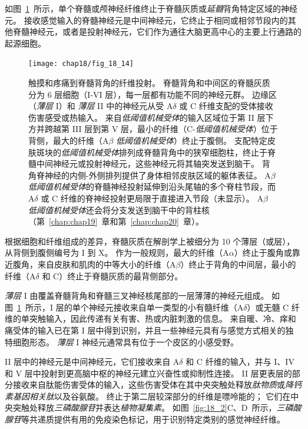 如图~\ref{fig:18_14}~所示，单个脊髓或颅神经纤维终止于脊髓灰质或\textit{延髓}背角特定区域的神经元。
接收感觉输入的脊髓神经元是中间神经元，它终止于相同或相邻节段内的其他脊髓神经元，或者是投射神经元，它们作为通往大脑更高中心的主要上行通路的起源细胞。


\begin{figure}[htbp]
	\centering
	\texttt{[image: chap18/fig\_18\_14]}
	\caption{触摸和疼痛到脊髓背角的纤维投射。
		脊髓背角和中间区的脊髓灰质分为 6 层细胞（I-VI 层），每一层都有功能不同的神经元群。
		边缘区（\textit{薄层} I）和 \textit{薄层} II 中的神经元从受 A$\delta$ 或 C 纤维支配的受体接收伤害感受或热输入。 
		来自\textit{低阈值机械受体}的输入区域位于第 II 层下方并跨越第 III 层到第 V 层，最小的纤维（C-\textit{低阈值机械受体}）位于背侧，最大的纤维（A$\beta$ \textit{低阈值机械受体}）终止于腹侧。
		支配特定皮肤斑块的\textit{低阈值机械受体}排列成脊髓背角中的狭窄细胞柱，终止于脊髓中间神经元或投射神经元，这些神经元将其轴突发送到脑干。
		背角脊神经的内侧-外侧排列提供了身体相邻皮肤区域的躯体表征。
		A$\beta$ \textit{低阈值机械受体}的脊髓神经投射延伸到沿头尾轴的多个脊柱节段，而 A$\delta$ 或 C 纤维的脊神经投射更局限于直接进入节段（未显示）。
		A$\beta$ \textit{低阈值机械受体}还会将分支发送到脑干中的背柱核（第~\ref{chap:chap19}~章和第~\ref{chap:chap20}~章）。}
	\label{fig:18_14}
\end{figure}


根据细胞和纤维组成的差异，脊髓灰质在解剖学上被细分为 10 个薄层（或层），从背侧到腹侧编号为 I 到 X。
作为一般规则，最大的纤维（A$\alpha$）终止于腹角或靠近腹角，来自皮肤和肌肉的中等大小的纤维（A$\beta$）终止于背角的中间层，最小的纤维（A$\delta$ 和 C）终止于脊髓灰质的最背侧部分。


\textit{薄层} I 由覆盖脊髓背角和脊髓三叉神经核尾部的一层薄薄的神经元组成。
如图~\ref{fig:18_14}~所示，I 层的单个神经元接收来自单一类型的小有髓纤维（A$\delta$）或无髓 C 纤维的单突触输入，因此传递有关有害、热或内脏刺激的信息。
来自暖、冷、痒和痛受体的输入已在第 I 层中得到识别，并且一些神经元具有与感觉方式相关的独特细胞形态。
\textit{薄层} I 神经元通常具有位于一个皮区的小感受野。


II 层中的神经元是中间神经元，它们接收来自 A$\delta$ 和 C 纤维的输入，并与 I、IV 和 V 层中投射到更高脑中枢的神经元建立兴奋性或抑制性连接。
II 层更表层的部分接收来自肽能伤害受体的输入，这些伤害受体在其中央突触处释放\textit{肽物质}或\textit{降钙素基因相关肽}以及谷氨酸。
终止于第二层较深部分的纤维是嘌呤能的；
它们在中央突触处释放\textit{三磷酸腺苷}并表达\textit{植物凝集素}。
如图~\ref{fig:18_2}C、D~所示，\textit{三磷酸腺苷}等共递质提供有用的免疫染色标记，用于识别特定类别的感觉神经纤维。


